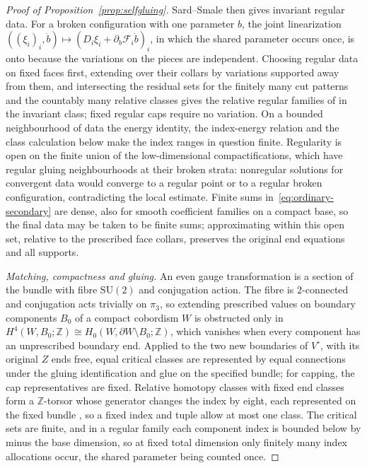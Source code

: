 \documentclass[11pt]{amsart}
\theoremstyle{definition}
\theoremstyle{remark}
\theoremstyle{plain}
\numberwithin{equation}{section}
\newcommand{\ZZ}{\mathbb Z}
\newcommand{\SU}{\mathrm{SU}}
\begin{document}
\begin{proof}[Proof of Proposition~\ref{prop:selfgluing}]
Sard--Smale then gives invariant regular data. For a broken configuration
with one parameter $b$, the joint linearization
$((\xi_i)_i,\dot b)\mapsto(D_i\xi_i+\partial_b\mathcal F_i\dot b)_i$, in which
the shared parameter occurs once, is onto because the variations on the
pieces are independent. Choosing regular data on fixed faces first,
extending over their collars by variations supported away from them, and
intersecting the residual sets for the finitely many cut patterns and the
countably many relative classes gives the relative regular families of
\cite[Proposition~3.10 and Section~3.9]{KM-unknot} in the invariant class;
fixed regular caps require no variation. On a bounded neighbourhood of data
the energy identity, the index-energy relation and the class calculation below
make the index ranges in question finite. Regularity is open on the finite
union of the low-dimensional compactifications, which have regular gluing
neighbourhoods at their broken strata: nonregular solutions for convergent
data would converge to a regular point or to a regular broken configuration,
contradicting the local estimate. Finite sums in~\eqref{eq:ordinary-secondary}
are dense, also for smooth coefficient families on a compact base, so the
final data may be taken to be finite sums; approximating within this open set,
relative to the prescribed face collars, preserves the original end equations
and all supports.

\emph{Matching, compactness and gluing.} An even gauge transformation is a
section of the bundle with fibre $\SU(2)$ and conjugation action. The fibre is
$2$-connected and conjugation acts trivially on $\pi_3$, so extending
prescribed values on boundary components $B_0$ of a compact cobordism $W$ is
obstructed only in $H^4(W,B_0;\ZZ)\cong H_0(W,\partial W\setminus B_0;\ZZ)$,
which vanishes when every component has an unprescribed boundary end. Applied
to the two new boundaries of $V^\circ$, with its original $Z$ ends free,
equal critical classes are represented by equal connections under the gluing
identification and glue on the specified bundle; for capping, the cap
representatives are fixed. Relative homotopy classes with fixed end classes
form a $\ZZ$-torsor whose generator changes the index by eight, each
represented on the fixed bundle \cite[Sections~3.2 and~3.7]{KM-unknot}, so a
fixed index and tuple allow at most one class. The critical sets are finite, and in a regular
family each component index is bounded below by minus the base dimension, so at fixed total
dimension only finitely many index allocations occur, the shared parameter being counted once.


\end{proof}
\end{document}

